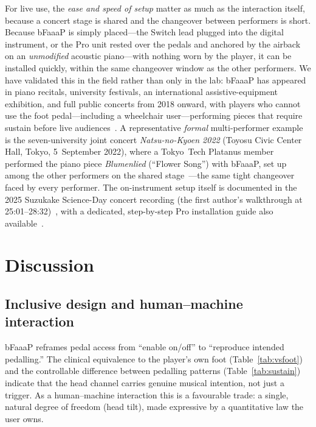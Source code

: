 For live use, the \emph{ease and speed of setup} matter as much as the interaction
itself, because a concert stage is shared and the changeover between performers is
short. Because bFaaaP is simply placed---the Switch lead plugged into the digital
instrument, or the Pro unit rested over the pedals and anchored by the airback on an
\emph{unmodified} acoustic piano---with nothing worn by the player, it can be installed
quickly, within the same changeover window as the other performers. We have validated
this in the field rather than only in the lab: bFaaaP has appeared in piano recitals,
university festivals, an international assistive-equipment exhibition, and full public
concerts from 2018 onward, with players who cannot use the foot pedal---including a
wheelchair user---performing pieces that require sustain before live
audiences~\cite{repo,videos}. A representative \emph{formal} multi-performer example
is the seven-university joint concert \emph{Natsu-no-Kyoen 2022} (Toyosu Civic
Center Hall, Tokyo, 5~September 2022), where a Tokyo~Tech Platanus member
performed the piano piece \emph{Blumenlied} (``Flower Song'') with bFaaaP, set up
among the other performers on the shared stage~\cite{concert_kyoen2022}---the same
tight changeover faced by every performer. The on-instrument setup itself is
documented in the 2025 Suzukake Science-Day concert recording (the first author's
walkthrough at 25:01--28:32)~\cite{concert_suzukake2025}, with a dedicated,
step-by-step Pro installation guide also available~\cite{video_pro_setup}.



\section{Discussion}
\label{sec:discussion}

\subsection{Inclusive design and human--machine interaction}
bFaaaP reframes pedal access from ``enable on/off'' to ``reproduce intended
pedalling.'' The clinical equivalence to the player's own foot
(Table~\ref{tab:vsfoot}) and the controllable difference between pedalling
patterns (Table~\ref{tab:sustain}) indicate that the head channel carries genuine
musical intention, not just a trigger. As a human--machine interaction this is a
favourable trade: a single, natural degree of freedom (head tilt), made expressive
by a quantitative law the user owns.

